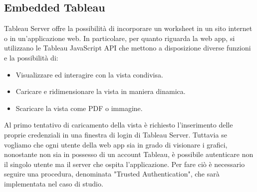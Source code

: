\subsection{Embedded Tableau}

Tableau Server offre la possibilità di incorporare un worksheet in un sito internet o in un'applicazione web. In particolare, per quanto riguarda la web app, si utilizzano le Tableau JavaScript API che mettono a disposizione diverse funzioni e la possibilità di:

\begin{itemize}
    \item Visualizzare ed interagire con la vista condivisa.
    \item Caricare e ridimensionare la vista in maniera dinamica.
    \item Scaricare la vista come PDF o immagine.
\end{itemize}

Al primo tentativo di caricamento della vista è richiesto l'inserimento delle proprie credenziali in una finestra di login di Tableau Server. Tuttavia se vogliamo che ogni utente della web app sia in grado di visionare i grafici, nonostante non sia in possesso di un account Tableau, è possibile autenticare non il singolo utente ma il server che ospita l'applicazione. Per fare ciò è necessario seguire una procedura, denominata "Trusted Authentication", che sarà implementata nel caso di studio. 